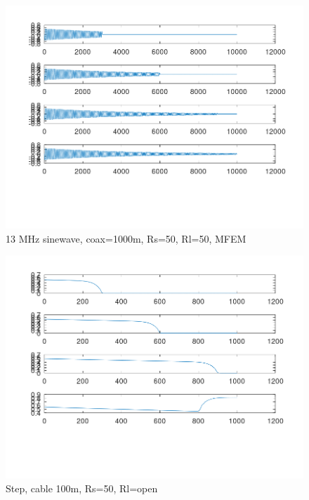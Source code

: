 \documentclass[12pt, letterpaper]{article}
\begin{document}
\begin{figure}[H]
	\centering
	\includegraphics[width=1\textwidth]{1000m_mfem.png} %
	\caption{13 MHz sinewave, coax=1000m, Rs=50, Rl=50, MFEM}
\end{figure}

\begin{figure}[H]
	\centering
	\includegraphics[width=1\textwidth]{step-1_mfem.png} %
	\caption{Step, cable 100m, Rs=50, Rl=open}
\end{figure}
\end{document}

